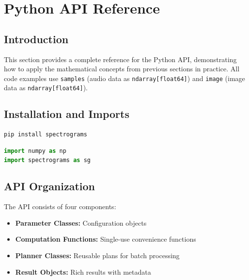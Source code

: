 
\section{Python API Reference}\label{sec:python_guide}

\subsection{Introduction}\label{subsec:python_intro}

This section provides a complete reference for the Python API, demonstrating
how to apply the mathematical concepts from previous sections in practice.
All code examples use \texttt{samples} (audio data as \texttt{ndarray[float64]})
and \texttt{image} (image data as \texttt{ndarray[float64]}).

\subsection*{Installation and Imports}

\begin{lstlisting}[language=bash, caption={Installing the spectrograms package}]
pip install spectrograms
\end{lstlisting}

\begin{lstlisting}[language=Python, caption={Importing numpy and spectrograms}]
import numpy as np
import spectrograms as sg
\end{lstlisting}

\subsection*{API Organization}

The API consists of four components:
\begin{itemize}[itemsep=2pt]
  \item \textbf{Parameter Classes:} Configuration objects
  \item \textbf{Computation Functions:} Single-use convenience functions
  \item \textbf{Planner Classes:} Reusable plans for batch processing
  \item \textbf{Result Objects:} Rich results with metadata
\end{itemize}

